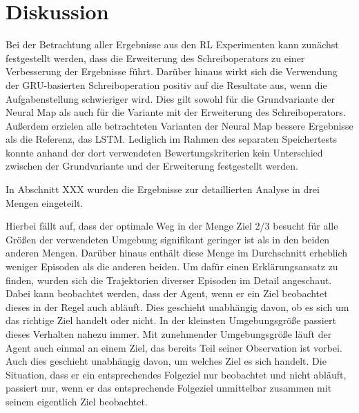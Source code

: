 \chapter{Diskussion}
\label{chap_disc}


Bei der Betrachtung aller Ergebnisse aus den RL Experimenten kann zunächst festgestellt werden, dass die Erweiterung des Schreiboperators zu einer Verbesserung der Ergebnisse führt. Darüber hinaus wirkt sich die Verwendung der GRU-basierten Schreiboperation positiv auf die Resultate aus, wenn die Aufgabenstellung schwieriger wird. Dies gilt sowohl für die Grundvariante der Neural Map als auch für die Variante mit der Erweiterung des Schreiboperators. Außerdem erzielen alle betrachteten Varianten der Neural Map bessere Ergebnisse als die Referenz, das LSTM. Lediglich im Rahmen des separaten Speichertests konnte anhand der dort verwendeten Bewertungskriterien kein Unterschied zwischen der Grundvariante und der Erweiterung festgestellt werden.

In Abschnitt XXX wurden die Ergebnisse zur detaillierten Analyse in drei Mengen eingeteilt.

Hierbei fällt auf, dass der optimale Weg in der Menge \glqq Ziel 2/3 besucht\grqq{} für alle Größen der verwendeten Umgebung signifikant geringer ist als in den beiden anderen Mengen. Darüber hinaus enthält diese Menge im Durchschnitt erheblich weniger Episoden als die anderen beiden. Um dafür einen Erklärungsansatz zu finden, wurden sich die Trajektorien diverser Episoden im Detail angeschaut. Dabei kann beobachtet werden, dass der Agent, wenn er ein Ziel beobachtet dieses in der Regel auch abläuft. Dies geschieht unabhängig davon, ob es sich um das richtige Ziel handelt oder nicht. In der kleinsten Umgebungsgröße passiert dieses Verhalten nahezu immer. Mit zunehmender Umgebungsgröße läuft der Agent auch einmal an einem Ziel, das bereits Teil seiner Observation ist vorbei. Auch dies geschieht unabhängig davon, um welches Ziel es sich handelt. Die Situation, dass er ein entsprechendes Folgeziel nur beobachtet und nicht abläuft, passiert nur, wenn er das entsprechende Folgeziel unmittelbar zusammen mit seinem eigentlich Ziel beobachtet.



